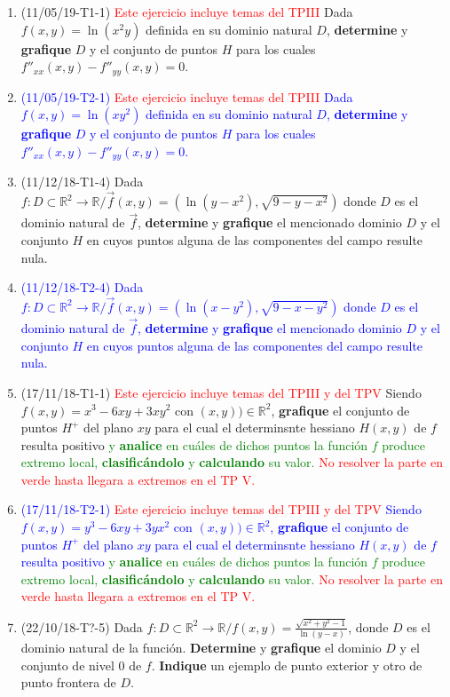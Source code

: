 \documentclass[12pt,a4paper]{article}
\renewcommand{\b}[1]{\textbf{#1}}
\newcommand{\red}[1]{\textcolor{red}{#1}}
\newcommand{\blue}[1]{\textcolor{blue}{#1}}
\newcommand{\green}[1]{\textcolor{green}{#1}}
\newcommand{\R}{\mathbb{R}}
\begin{document}
\begin{enumerate}
	\item (11/05/19-T1-1) \red{Este ejercicio incluye temas del TPIII} Dada $ f(x, y)=\ln{(x^2y)}$ definida en su dominio natural $D$, \textbf{determine} y \textbf{grafique} $D$ y el conjunto de puntos $H$ para los cuales $f''_{xx}(x,y)-f''_{yy}(x,y)=0$. \label{ej:parciales16}
	
	\item \blue{(11/05/19-T2-1) \red{Este ejercicio incluye temas del TPIII} Dada $ f(x, y)=\ln{(xy^2)}$ definida en su dominio natural $D$, \textbf{determine} y \textbf{grafique} $D$ y el conjunto de puntos $H$ para los cuales $f''_{xx}(x,y)-f''_{yy}(x,y)=0$.} \label{ej:parciales17}
	
	\item (11/12/18-T1-4) Dada $f:D\subset\R^2\rightarrow\R / \vec{f}(x, y)=(\ln{(y-x^2)}, \sqrt{9-y-x^2})$ donde $D$ es el dominio natural de $\vec{f}$, \textbf{determine} y \textbf{grafique} el mencionado dominio $D$ y el conjunto  $H$ en cuyos puntos alguna de las componentes del campo resulte nula.
	
	\item \blue{(11/12/18-T2-4) Dada $f:D\subset\R^2\rightarrow\R / \vec{f}(x, y)=(\ln{(x-y^2)}, \sqrt{9-x-y^2})$ donde $D$ es el dominio natural de $\vec{f}$, \textbf{determine} y \textbf{grafique} el mencionado dominio $D$ y el conjunto  $H$ en cuyos puntos alguna de las componentes del campo resulte nula.}
	
	\item (17/11/18-T1-1) \red{Este ejercicio incluye temas del TPIII y del TPV} Siendo $f(x,y)=x^3-6xy+3xy^2$ con $(x,y)) \in \R^2$, \b{grafique} el conjunto de puntos $H^+$ del plano $xy$ para el cual el determinsnte hessiano $H(x,y)$ de $f$ resulta positivo \green{y \b{analice} en cuáles de dichos puntos la función $f$ produce extremo local, \b{clasificándolo} y \b{calculando} su valor.}  \red{No resolver la parte en verde hasta llegara a extremos en el TP V.}
	
	\item \blue{(17/11/18-T2-1) \red{Este ejercicio incluye temas del TPIII y del TPV} Siendo $f(x,y)=y^3-6xy+3yx^2$ con $(x,y)) \in \R^2$, \b{grafique} el conjunto de puntos $H^+$ del plano $xy$ para el cual el determinsnte hessiano $H(x,y)$ de $f$ resulta positivo \green{y \b{analice} en cuáles de dichos puntos la función $f$ produce extremo local, \b{clasificándolo} y \b{calculando} su valor.}  \red{No resolver la parte en verde hasta llegara a extremos en el TP V.}}
	
	\item (22/10/18-T?-5) Dada $f:D\subset\R^2\rightarrow\R / f(x, y)=\frac{\sqrt{x^2+y^2-1}}{\ln{(y-x)}}$, donde $D$ es el dominio natural de la función. \textbf{Determine} y \textbf{grafique} el dominio $D$ y el conjunto   de nivel $0$ de $f$. \b{Indique} un ejemplo de punto exterior y otro de punto frontera de $D$.
	

\end{enumerate}
\end{document}
